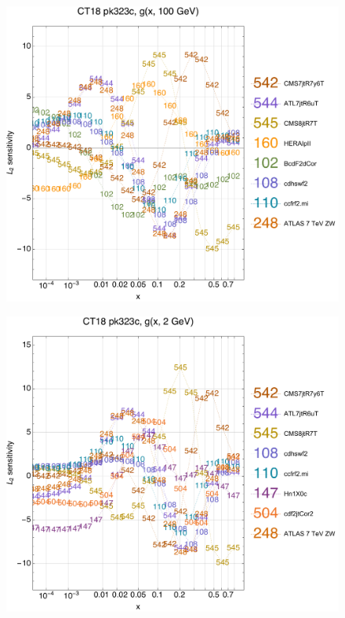 \documentclass[10pt,aps,prd,floatfix,titlepage]{revtex4}
\begin{document}
\clearpage
\begin{figure}
\includegraphics[width=\textwidth,height=0.44\textheight,keepaspectratio]{1/ifl0_ct18nn_L2_q100_Sf_1.pdf}
\caption{}
\end{figure}
\begin{figure}
\includegraphics[width=\textwidth,height=0.44\textheight,keepaspectratio]{1/ifl0_ct18nn_L2_q2_Sf_1.pdf}
\caption{}
\end{figure}
\end{document}
